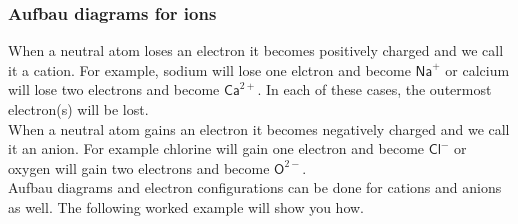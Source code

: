 \subsubsection*{Aufbau diagrams for ions}
When a neutral atom loses an electron it becomes positively charged and we call it a cation. For example, sodium will lose one elctron and become $\mathsf{Na}^{+}$ or calcium will lose two electrons and become $\mathsf{Ca}^{2+}$. In each of these cases, the outermost electron(s) will be lost. \\
When a neutral atom gains an electron it becomes negatively charged and we call it an anion. For example chlorine will gain one electron and become $\mathsf{Cl}^{-}$ or oxygen will gain two electrons and become $\mathsf{O}^{2-}$.  \\
Aufbau diagrams and electron configurations can be done for cations and anions as well. The following worked example will show you how. \\
